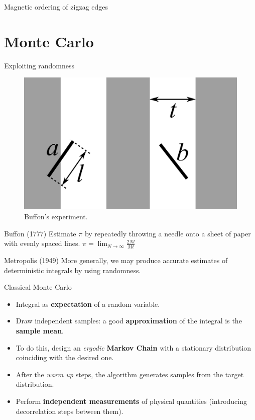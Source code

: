\documentclass{beamer}
\begin{document}
\begin{frame}{Magnetic ordering of zigzag edges}
\end{frame}
  
  \section{Monte Carlo}
 	 
  \begin{frame}{Exploiting randomness}

	\begin{figure}
 	 \centering
      \includegraphics[scale = 0.18]{buffon}
 	 \caption{Buffon's experiment.}
 	 \end{figure}  
  
  \begin{block}{Buffon (1777)}
        Estimate $\pi$ by repeatedly throwing a needle onto a sheet of paper with evenly spaced lines. $\pi = \lim_{N\rightarrow \infty} \frac{2Nl}{Mt}$
      \end{block}

      \begin{block}{Metropolis (1949)}
        More generally, we may produce accurate estimates of deterministic  integrals by using randomness.
      \end{block}
      
  \end{frame}
  
  \begin{frame}{Classical Monte Carlo}
  
	\begin{itemize}
	\item Integral as \textbf{expectation} of a random variable.
	\item Draw independent samples: a good \textbf{approximation} of the integral is the \textbf{sample mean}.
	\item To do this, design an \emph{ergodic} \textbf{Markov Chain} with a stationary distribution coinciding with the desired one.
	\item After the \emph{warm up} steps, the algorithm generates samples from the target distribution.
	\item Perform \textbf{independent measurements} of physical quantities (introducing decorrelation steps between them).
	\end{itemize}  
  
  \end{frame}
  
\end{document}
